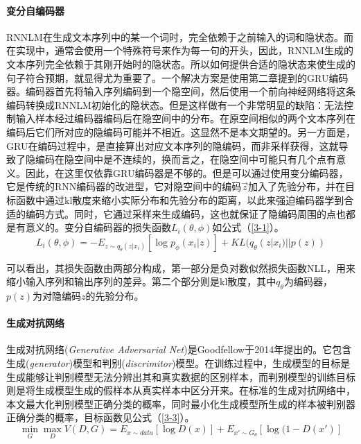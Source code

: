 \paragraph{变分自编码器}
RNNLM在生成文本序列中的某一个词时，完全依赖于之前输入的词和隐状态。而在实现中，通常会使用一个特殊符号来作为每一句的开头，因此，RNNLM生成的文本序列完全依赖于其刚开始时的隐状态。所以如何提供合适的隐状态来使生成的句子符合预期，就显得尤为重要了。一个解决方案是使用第二章提到的GRU编码器。编码器首先将输入序列编码到一个隐空间，然后使用一个前向神经网络将这条编码转换成RNNLM初始化的隐状态。但是这样做有一个非常明显的缺陷：无法控制输入样本经过编码器编码后在隐空间中的分布。在原空间相似的两个文本序列在编码后它们所对应的隐编码可能并不相近。这显然不是本文期望的。另一方面是，GRU在编码过程中，是直接算出对应文本序列的隐编码，而非采样获得，这就导致了隐编码在隐空间中是不连续的，换而言之，在隐空间中可能只有几个点有意义。因此，在这里仅依靠GRU编码器是不够的。但是可以通过使用变分编码器，它是传统的RNN编码器的改进型，它对隐空间中的编码\(\overrightarrow{z}\)加入了先验分布，并在目标函数中通过kl散度来缩小实际分布和先验分布的距离，以此来强迫编码器学到合适的编码方式。同时，它通过采样来生成编码，这也就保证了隐编码周围的点也都是有意义的。变分自编码器的损失函数$L_i(\theta,\phi)$如公式（\ref{3-1}）。
\begin{equation}\label{3-1}
    L_i(\theta,\phi)=-E_{z\sim q_\theta(z|x_i)}[\log p_\phi(x_i|z)]+KL (q_\theta(z|x_i)||p(z))
\end{equation}

可以看出，其损失函数由两部分构成，第一部分是负对数似然损失函数NLL，用来缩小输入序列和输出序列的差异。第二个部分则是kl散度，其中$q_\theta$为编码器，$p(z)$为对隐编码$z$的先验分布。
\paragraph{生成对抗网络}
生成对抗网络(\textit{Generative Adversarial Net}\cite{goodfellow_generative_2014,GAN_CH})是Goodfellow于2014年提出的。它包含生成(\textit{generator})模型和判别(\textit{discrimitor})模型。在训练过程中，生成模型的目标是生成能够让判别模型无法分辨出其和真实数据的区别样本，而判别模型的训练目标则是将生成模型生成的假样本从真实样本中区分开来。在标准的生成对抗网络中，本文最大化判别模型正确分类的概率，同时最小化生成模型所生成的样本被判别器正确分类的概率，目标函数见公式（\ref{3-3}）。
\begin{equation}\label{3-3}
    \mathop{min}_G \mathop{max}_D V(D,G)=E_{x\sim data}[\log D(x)]+E_{x'\sim G_\theta}[\log(1-D(x')]
\end{equation}

